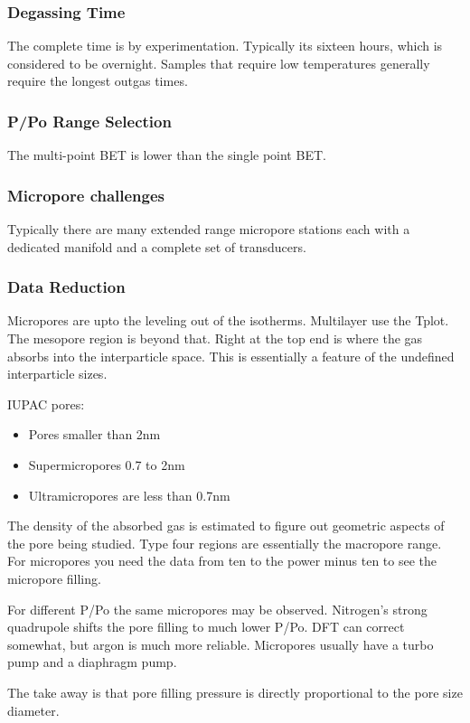 \documentclass[12pt,a4paper,oneside,headinclude]{scrartcl}
\numberwithin{figure}{section}
\numberwithin{equation}{section}
\numberwithin{table}{section}
\begin{document}
\subsubsection{Degassing Time}
\label{sec:orgf5ed340}
The complete time is by experimentation. Typically its sixteen hours, which is
considered to be overnight. Samples that require low temperatures generally
require the longest outgas times.
\subsubsection{P/Po Range Selection}
\label{sec:org8a7bddd}
The multi-point BET is lower than the single point BET.
\subsubsection{Micropore challenges}
\label{sec:orgd1c5b42}
Typically there are many extended range micropore stations each with a dedicated
manifold and a complete set of transducers.
\subsubsection{Data Reduction}
\label{sec:org0ccee62}
Micropores are upto the leveling out of the isotherms. Multilayer use the Tplot.
The mesopore region is beyond that. Right at the top end is where the gas
absorbs into the interparticle space. This is essentially a feature of the
undefined interparticle sizes.

IUPAC pores:
\begin{itemize}
\item Pores smaller than 2nm
\item Supermicropores 0.7 to 2nm
\item Ultramicropores are less than 0.7nm
\end{itemize}

The density of the absorbed gas is estimated to figure out geometric aspects of
the pore being studied. Type four regions are essentially the macropore range.
For micropores you need the data from ten to the power minus ten to see the
micropore filling.

For different P/Po the same micropores may be observed. Nitrogen's strong
quadrupole shifts the pore filling to much lower P/Po. DFT can correct somewhat,
but argon is much more reliable.
Micropores usually have a turbo pump and a diaphragm pump.

The take away is that pore filling pressure is directly proportional to the pore
size diameter.
\end{document}
